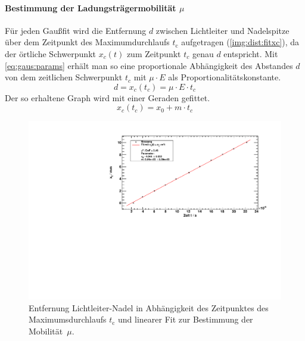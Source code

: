 \paragraph{Bestimmung der Ladungsträgermobilität $\mu$}
Für jeden Gaußfit wird die Entfernung $d$ zwischen Lichtleiter und Nadelspitze über dem Zeitpunkt des Maximumdurchlaufs $t_{\text{c}}$ 
aufgetragen (\autoref{img:dist:fitxc}), da der örtliche Schwerpunkt $x_c(t)$ zum Zeitpunkt $t_c$ genau $d$ entspricht. Mit 
\autoref{eq:gaus:params} erhält man so eine proportionale Abhängigkeit des Abstandes $d$ von dem zeitlichen Schwerpunkt $t_c$ mit 
$\mu \cdot E$ als Proportionalitätskonstante.
\begin{equation}
  d = x_c(t_c) = \mu \cdot E \cdot t_c
\end{equation} 
Der so erhaltene Graph wird mit einer Geraden gefittet.
\begin{equation}
  x_c(t_c) = x_0 + m \cdot t_c
\end{equation}

\begin{figure}[H]
\begin{center}
  \includegraphics[width=\textwidth]{../img/part2/dist_fitXc.pdf}
  \caption{Entfernung Lichtleiter-Nadel in Abhängigkeit des Zeitpunktes des Maximumsdurchlaufs $t_{\text{c}}$
  und linearer Fit zur Bestimmung der Mobilität~$\mu$.} %
  \label{img:dist:fitxc}
\end{center}
\end{figure}

